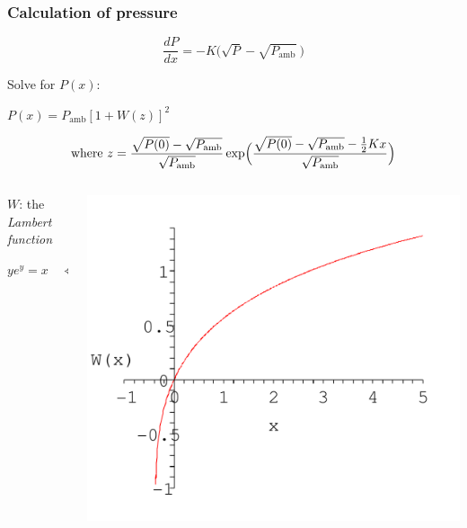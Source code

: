 \documentclass[10pt]{beamer}
\newcommand{\Pu}{P_{\mathrm{amb}}}
\begin{document}
\begin{frame}
  \frametitle{Calculation of pressure}

\begin{displaybox}{60mm}
\[
  \frac{dP}{dx} = - K \bigl(\sqrt{P} - \sqrt{\Pu}\:\bigr)
\]
\end{displaybox}

\bigskip

\pause

\begin{center}
  Solve for $P(x)$:\qquad
  \begin{onlinebox}{45mm} $\displaystyle P(x) = \Pu [ 1 + W(z)]^2$
  \end{onlinebox}
\end{center}

\bigskip

\[
\text{where } z = \frac
  {\sqrt{P(0)} - \sqrt{\Pu}}{\sqrt{\Pu}}
  \exp\Bigl(\frac{\sqrt{P(0)} - \sqrt{\Pu} - \frac12 Kx}{\sqrt{\Pu}}\Bigr)
\]


\begin{columns}
  \begin{column}{0.4\textwidth}
    $W$: the \textit{Lambert function}
    \bigskip

    $\displaystyle ye^y = x \quad \Leftrightarrow \quad y = W(x)$
  \end{column}
  \begin{column}{0.4\textwidth}
    \includegraphics[width=\textwidth]{lambertW.pdf}
  \end{column}
\end{columns}

\end{frame}
\end{document}
